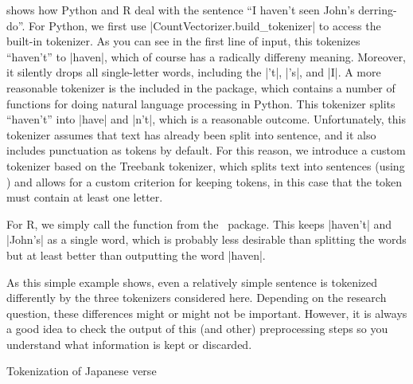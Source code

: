  shows how Python and R deal with the sentence ``I haven't seen John's derring-do''.
For Python, we first use |CountVectorizer.build_tokenizer| to access the built-in tokenizer.
As you can see in the first line of input, this tokenizes ``haven't'' to |haven|,
which of course has a radically differeny meaning. Moreover, it silently drops all single-letter words,
including the |'t|, |'s|, and |I|.
A more reasonable tokenizer is the  included in the  package, which contains a number of functions for doing natural language processing in Python.
This tokenizer splits ``haven't'' into |have| and |n't|, which is a reasonable outcome.
Unfortunately, this tokenizer assumes that text has already been split into sentence,
and it also includes punctuation as tokens by default.
For this reason, we introduce a custom tokenizer based on the Treebank tokenizer,
which splits text into sentences (using ) and allows for a custom criterion for keeping tokens,
in this case that the token must contain at least one letter. 

For R, we simply call the  function from the \quanteda\ package.
This keeps |haven't| and |John's| as a single word, which is probably less desirable than splitting the words
but at least better than outputting the word |haven|.

As this simple example shows, even a relatively simple sentence is tokenized differently by the three tokenizers considered here.
Depending on the research question, these differences might or might not be important.
However, it is always a good idea to check the output of this (and other) preprocessing steps so you understand
what information is kept or discarded.

\begin{ccsexample}
  \begin{tcbraster}[raster columns=2,raster equal height=rows,raster valign=top]
  \begin{tcolorbox}[title=Python Output]
      \texttt{[image: \{ch\_dtm/haiku.py]}.png}
  \end{tcolorbox}%
  \begin{tcolorbox}[title=R Output]
      \texttt{[image: \{ch\_dtm/haiku.r]}.png}
  \end{tcolorbox}%
\end{tcbraster}
  \caption{Tokenization of Japanese verse}\label{ex:haiku}
\end{ccsexample}



